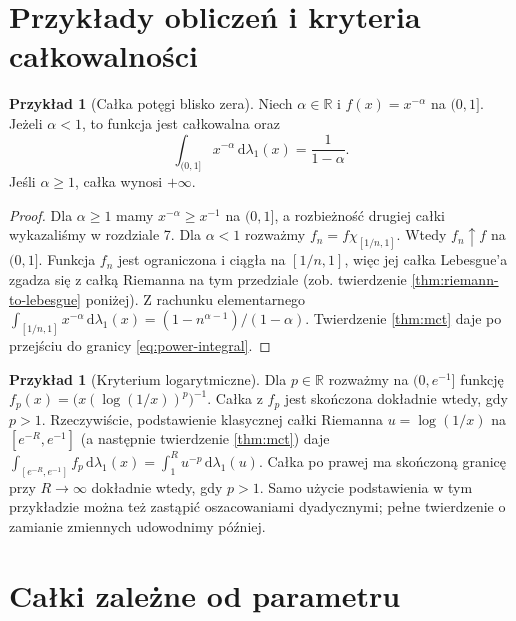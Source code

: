 \documentclass[11pt,a4paper,oneside]{book}
\numberwithin{equation}{chapter}
\theoremstyle{plain}
\theoremstyle{definition}
\newtheorem{przyklad}[twierdzenie]{Przykład}
\theoremstyle{remark}
\begin{document}
\section{Przykłady obliczeń i kryteria całkowalności}

\begin{przyklad}[Całka potęgi blisko zera]
\label{ex:power-integral}
Niech $\alpha\in\mathbb R$ i
$f(x)=x^{-\alpha}$ na $(0,1]$.
Jeżeli $\alpha<1$, to funkcja jest całkowalna oraz
\begin{equation}\label{eq:power-integral}
\int_{(0,1]}x^{-\alpha}\,\mathrm d\lambda_1(x)
=\frac1{1-\alpha}.
\end{equation}
Jeśli $\alpha\ge1$, całka wynosi $+\infty$.
\end{przyklad}
\begin{proof}
Dla $\alpha\ge1$ mamy $x^{-\alpha}\ge x^{-1}$
na $(0,1]$, a rozbieżność drugiej całki
wykazaliśmy w rozdziale 7. Dla $\alpha<1$
rozważmy $f_n=f\chi_{[1/n,1]}$.
Wtedy $f_n\uparrow f$ na $(0,1]$.
Funkcja $f_n$ jest ograniczona i ciągła na
$[1/n,1]$, więc jej całka Lebesgue'a zgadza się
z całką Riemanna na tym przedziale (zob.
twierdzenie \ref{thm:riemann-to-lebesgue} poniżej).
Z rachunku elementarnego
$\int_{[1/n,1]}x^{-\alpha}\,\mathrm d\lambda_1(x)
=(1-n^{\alpha-1})/(1-\alpha)$.
Twierdzenie \ref{thm:mct} daje po przejściu do
granicy \eqref{eq:power-integral}.
\end{proof}

\begin{przyklad}[Kryterium logarytmiczne]
Dla $p\in\mathbb R$ rozważmy na $(0,e^{-1}]$
funkcję $f_p(x)=\bigl(x(\log(1/x))^p\bigr)^{-1}$.
Całka z $f_p$ jest skończona dokładnie wtedy, gdy
$p>1$. Rzeczywiście, podstawienie klasycznej
całki Riemanna $u=\log(1/x)$ na
$[e^{-R},e^{-1}]$ (a następnie twierdzenie
\ref{thm:mct}) daje
$\int_{[e^{-R},e^{-1}]}f_p\,\mathrm d\lambda_1(x)
=\int_1^R u^{-p}\,\mathrm d\lambda_1(u)$.
Całka po prawej ma skończoną granicę przy
$R\to\infty$ dokładnie wtedy, gdy $p>1$.
Samo użycie podstawienia w tym przykładzie
można też zastąpić oszacowaniami dyadycznymi;
pełne twierdzenie o zamianie zmiennych
udowodnimy później.
\end{przyklad}

\section{Całki zależne od parametru}
\end{document}
